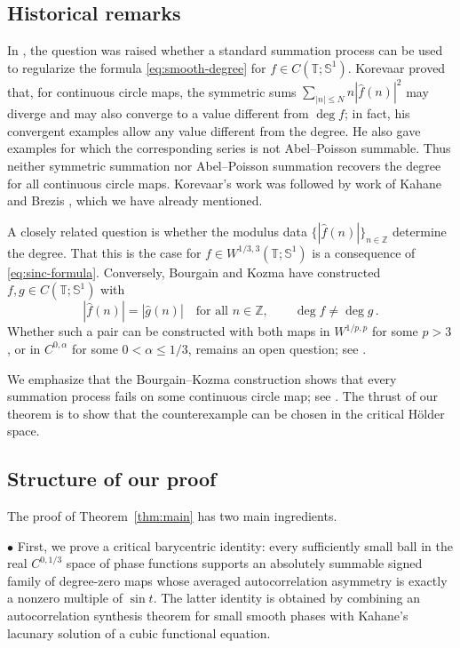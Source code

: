 \documentclass[11pt]{amsart}
\theoremstyle{definition}
\theoremstyle{remark}
\newcommand{\T}{\mathbb T}
\newcommand{\Sone}{\mathbb S^1}
\newcommand{\Z}{\mathbb Z}
\newcommand{\wh}{\widehat}
\DeclareMathOperator{\degmap}{deg}
\begin{document}

\subsection*{Historical remarks}

In \cite{BrezisNirenberg1995,Brezis1997}, the question was raised whether a standard
summation process can be used to regularize the formula
\eqref{eq:smooth-degree} for $f\in C(\T;\Sone)$. Korevaar
\cite{Korevaar1999} proved that, for continuous circle maps, the symmetric
sums $\sum_{|n|\leq N}n|\wh f(n)|^2$ may diverge and may also converge to a value different from $\degmap f$;
in fact, his convergent examples allow any value different from the
degree. He also gave examples for which the corresponding series is not
Abel--Poisson summable. Thus neither symmetric summation nor
Abel--Poisson summation recovers the degree for all continuous circle
maps. Korevaar's work was followed by work of Kahane
\cite{Kahane2005} and Brezis \cite{Brezis2006}, which we have already mentioned.

A closely related question is whether the modulus data $\{|\wh f(n)|\}_{n\in\Z}$ determine the degree. That this is the case for $f\in W^{1/3,3}(\T;\Sone)$ is a consequence of \eqref{eq:sinc-formula}. Conversely, Bourgain and Kozma \cite{BourgainKozma2007} have constructed $f,g\in C(\T;\Sone)$ with
\[
 |\wh f(n)|=|\wh g(n)|\quad\text{for all }n\in\Z,
 \qquad
 \degmap f\ne\degmap g \,.
\]
Whether such a pair can be constructed with both maps in $W^{1/p,p}$ for
some $p>3$, or in $C^{0,\alpha}$ for some $0<\alpha\leq1/3$, remains an
open question; see \cite[Open Problem~5.5]{Brezis2023}.

We emphasize that the Bourgain--Kozma construction shows that every summation process fails on some continuous circle map; see \cite[Corollary~5.1]{Brezis2023}. The thrust of our theorem is to show that the counterexample can be chosen in the critical H\"older space.


\subsection*{Structure of our proof}

The proof of Theorem~\ref{thm:main} has two main ingredients.  

$\bullet$ First, we prove a critical barycentric identity: every sufficiently small ball in the real $C^{0,1/3}$ space of phase functions supports an absolutely summable signed family of degree-zero maps whose averaged autocorrelation asymmetry is exactly a nonzero multiple of $\sin t$.  The latter identity is obtained by combining an autocorrelation synthesis theorem for small smooth phases with Kahane's lacunary solution of a cubic functional equation.
\end{document}
